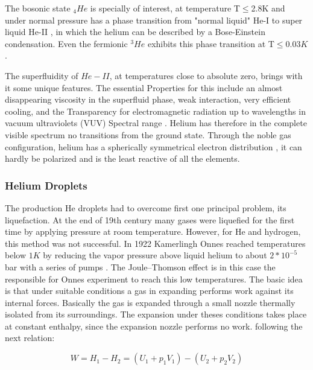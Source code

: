 The bosonic state $_{4}He$ is specially of interest, at  temperature T$\leqslant$2.8K and under normal pressure has a phase transition from "normal liquid" He-I to super liquid He-II \cite{swenson_liquid-solid_1950}, in which the helium can be described by a Bose-Einstein condensation. Even the fermionic $^{3}He$ exhibits this phase transition at T$\leqslant 0.03K$ \cite{halperin_properties_1978}.

The superfluidity of $He-II$, at temperatures close to absolute zero, brings with it some unique features. The essential Properties for this include an almost disappearing viscosity in the superfluid phase, weak interaction, very efficient cooling, and the Transparency for electromagnetic radiation up to wavelengths in vacuum ultraviolets (VUV) Spectral range \cite{enss_low-temperature_2005}. Helium has therefore in the complete visible spectrum no transitions from the ground state. Through the noble gas configuration, helium has a spherically symmetrical electron distribution \cite{lewis_helium_2014}, it can hardly be polarized and is the least reactive of all the elements.

\subsubsection{Helium Droplets}

The production He droplets had to overcome first one principal problem, its liquefaction. At the end  of 19th century many gases were liquefied for the first time by applying pressure at room temperature. However, for He and hydrogen, this method was not successful. In 1922 Kamerlingh Onnes reached temperatures below $1K$ by reducing the vapor pressure above liquid helium to about $2*10^{-5}$ bar with a series of pumps \cite{van_delft_discovery_2010}. The Joule–Thomson effect \cite{weinberger_discovery_2013} is in this case the responsible for Onnes experiment to reach this low temperatures. The basic idea is that under suitable conditions a gas in expanding performs work against its internal forces. Basically the gas is expanded through a small nozzle thermally isolated from its surroundings. The expansion under theses conditions takes place at constant enthalpy, since the expansion nozzle performs no work. following the next relation:

\begin{equation}
W= H_{1}-H_{2} = (U_{1}+p_{1}V_{1})-(U_{2}+p_{2}V_{2})
\end{equation}


